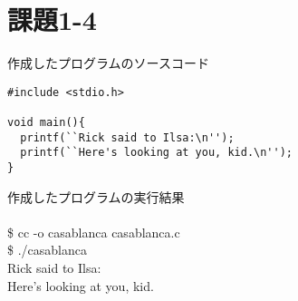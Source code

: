 \documentclass[12pt,a4paper]{jarticle}
\begin{document}
\section{課題1-4}
作成したプログラムのソースコード\\
\begin{lstlisting}[basicstyle=\ttfamily\footnotesize,frame=single]
#include <stdio.h>

void main(){
  printf(``Rick said to Ilsa:\n'');
  printf(``Here's looking at you, kid.\n'');
}
\end{lstlisting}

作成したプログラムの実行結果\\\\
\$ cc -o casablanca casablanca.c\\
\$ ./casablanca\\
Rick said to Ilsa:\\
Here's looking at you, kid.
\end{document}
